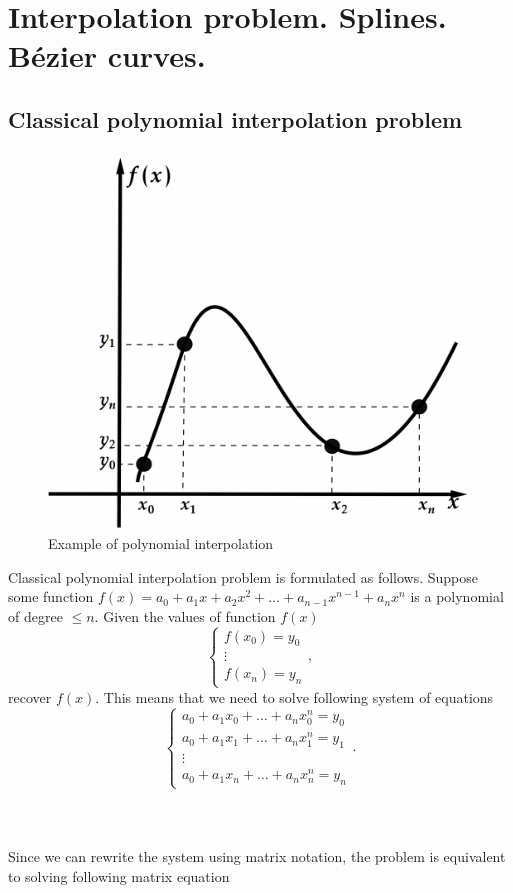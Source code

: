 \setcounter{section}{2}
\section{Interpolation problem. Splines. Bézier curves.}

\subsection*{Classical polynomial interpolation problem}
    \begin{figure}
        \includegraphics[width=0.43\columnwidth]{lectures/images/interpolation.png}
        \caption*{Example of polynomial interpolation}
    \end{figure}
    Classical polynomial interpolation problem is formulated as follows. Suppose some function $f(x) = a_0 + a_1x + a_2x^2 + \ldots + a_{n-1}x^{n-1} + a_{n} x^n$ is a polynomial of degree $\leq n$. Given the values of function $f(x)$ 
    \[
        \left\{ \begin{array}{c}
            f(x_0) = y_0 \\
            \vdots \\
            f(x_n) = y_n
        \end{array}\right.,
    \]
    recover $f(x)$. This means that we need to solve following system of equations
    \[
        \left\{
            \begin{array}{c}
                a_0 + a_1 x_0 + \ldots + a_n x_0^n = y_0 \\
                a_0 + a_1 x_1 + \ldots + a_n x_1^n = y_1 \\
                \vdots \\
                a_0 + a_1 x_n + \ldots + a_n x_n^n = y_n
            \end{array}
        \right..
    \]
\\\\\\
Since we can rewrite the system using matrix notation, the problem is equivalent to solving following matrix equation
